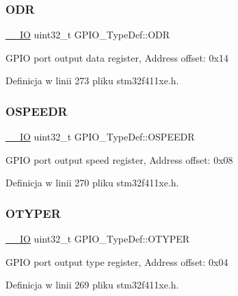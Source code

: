 \subsubsection{\texorpdfstring{O\+DR}{ODR}}
{\footnotesize\ttfamily \hyperlink{core__sc300_8h_aec43007d9998a0a0e01faede4133d6be}{\+\_\+\+\_\+\+IO} uint32\+\_\+t G\+P\+I\+O\+\_\+\+Type\+Def\+::\+O\+DR}

G\+P\+IO port output data register, Address offset\+: 0x14 

Definicja w linii 273 pliku stm32f411xe.\+h.

\mbox{\label{struct_g_p_i_o___type_def_a0d233d720f18ae2050f9131fa6faf7c6}} 
\subsubsection{\texorpdfstring{O\+S\+P\+E\+E\+DR}{OSPEEDR}}
{\footnotesize\ttfamily \hyperlink{core__sc300_8h_aec43007d9998a0a0e01faede4133d6be}{\+\_\+\+\_\+\+IO} uint32\+\_\+t G\+P\+I\+O\+\_\+\+Type\+Def\+::\+O\+S\+P\+E\+E\+DR}

G\+P\+IO port output speed register, Address offset\+: 0x08 

Definicja w linii 270 pliku stm32f411xe.\+h.

\mbox{\label{struct_g_p_i_o___type_def_a910885e4d881c3a459dd11640237107f}} 
\subsubsection{\texorpdfstring{O\+T\+Y\+P\+ER}{OTYPER}}
{\footnotesize\ttfamily \hyperlink{core__sc300_8h_aec43007d9998a0a0e01faede4133d6be}{\+\_\+\+\_\+\+IO} uint32\+\_\+t G\+P\+I\+O\+\_\+\+Type\+Def\+::\+O\+T\+Y\+P\+ER}

G\+P\+IO port output type register, Address offset\+: 0x04 

Definicja w linii 269 pliku stm32f411xe.\+h.

\mbox{\label{struct_g_p_i_o___type_def_a44ada3bfbe891e2efc1e06bda4c8014e}} 
